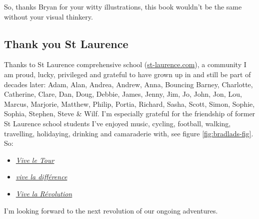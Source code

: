 \documentclass[
]{book}
\providecommand{\tightlist}{%
  \setlength{\itemsep}{0pt}\setlength{\parskip}{0pt}}
\begin{document}
So, thanks Bryan for your witty illustrations, this book wouldn't be the same without your visual thinkery. 🙏

\hypertarget{st-laurence}{%
\subsection{Thank you St Laurence}\label{st-laurence}}

Thanks to St Laurence comprehensive school (\href{https://st-laurence.com/}{st-laurence.com}), a community I am proud, lucky, privileged and grateful to have grown up in and still be part of decades later: Adam, Alan, Andrea, Andrew, Anna, Bouncing Barney, Charlotte, Catherine, Clare, Dan, Doug, Debbie, James, Jenny, Jim, Jo, John, Jon, Lou, Marcus, Marjorie, Matthew, Philip, Portia, Richard, Sasha, Scott, Simon, Sophie, Sophia, Stephen, Steve \& Wilf. I'm especially grateful for the friendship of former St Laurence school students I've enjoyed music, cycling, football, walking, travelling, holidaying, drinking and camaraderie with, see figure \ref{fig:bradlads-fig}. So:

\begin{itemize}
\tightlist
\item
  \emph{\href{https://en.wikipedia.org/wiki/Vive_le_Tour}{Vive le Tour}}
\item
  \emph{\href{https://en.wiktionary.org/wiki/vive_la_diff\%C3\%A9rence}{vive la différence}}
\item
  \emph{\href{https://en.wikipedia.org/wiki/Viva_la_revoluci\%C3\%B3n}{Vive la Révolution}}
\end{itemize}

I'm looking forward to the next revolution of our ongoing adventures.
\end{document}

